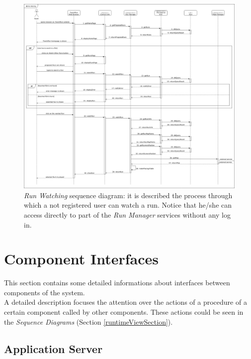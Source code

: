 \begin{figure}[H]
  \begin{center}
  	\includegraphics[width=\textwidth]{./img/sequence/watchRun.png}
    \hspace{0.05\linewidth}
    \centering
    \caption{\textit{Run Watching} sequence diagram: it is described the process through which a not registered user can watch a run. Notice that he/she can access directly to part of the \textit{Run Manager} services without any log in.}
		\label{img:watchRun}
    \end{center}
\end{figure}


\clearpage

\section{Component Interfaces}
This section contains some detailed informations about interfaces between components of the system.\\
A detailed description focuses the attention over the actions of a procedure of a certain component called by other components. These actions could be seen in the \textit{Sequence Diagrams} (Section \ref{runtimeViewSection}).

\subsection{Application Server}

